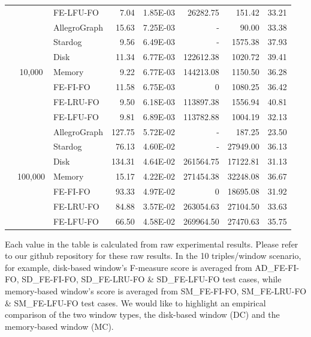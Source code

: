 \begin{table}[!htbp]
{\begin{tabular}{|c||c|l|r|r|r|r|r|}
&& FE-LFU-FO & 7.04 & 1.85E-03 & 26282.75 & 151.42 & 33.21 \\ \cline{2-8} 
& \multirow{7}{*}{10,000} &AllegroGraph& 15.63 & 7.25E-03 & - & 90.00 & 33.38 \\
&&Stardog& 9.56 & 6.49E-03 & - & 1575.38 & 37.93 \\ \cline{3-8} 
&& Disk & 11.34 & 6.77E-03 & 122612.38 & 1020.72 & 39.41 \\
&& Memory & 9.22 & 6.77E-03 & 144213.08 & 1150.50 & 36.28 \\ \cline{3-8} 
&& FE-FI-FO & 11.58 & 6.75E-03 & 0 & 1080.25 & 36.42 \\
&& FE-LRU-FO & 9.50 & 6.18E-03 & 113897.38 & 1556.94 & 40.81 \\
&& FE-LFU-FO & 9.81 & 6.89E-03 & 113782.88 & 1004.19 & 32.13 \\ \hhline{|=#=|=|=|=|=|=|=|}
\multirow{7}{*}{Large} & \multirow{7}{*}{100,000} &AllegroGraph& 127.75 & 5.72E-02 & - & 187.25 & 23.50 \\
&&Stardog& 76.13 & 4.60E-02 & - & 27949.00 & 36.13 \\ \cline{3-8} 
&& Disk & 134.31 & 4.64E-02 & 261564.75 & 17122.81 & 31.13 \\
&& Memory & 15.17 & 4.22E-02 & 271454.38 & 32248.08 & 36.67 \\ \cline{3-8} 
&& FE-FI-FO & 93.33 & 4.97E-02 & 0 & 18695.08 & 31.92 \\
&& FE-LRU-FO & 84.88 & 3.57E-02 & 263054.63 & 27104.50 & 33.63 \\
&& FE-LFU-FO & 66.50 & 4.58E-02 & 269964.50 & 27470.63 & 35.75 \\ \hline
\end{tabular}
}
\end{table}
Each value in the table is calculated from raw experimental results.
Please refer to our github repository for these raw results. 
In the 10 triples/window scenario, for example, 
disk-based window's F-measure score is averaged from AD\_FE-FI-FO, SD\_FE-FI-FO, SD\_FE-LRU-FO \& SD\_FE-LFU-FO test cases, 
while memory-based window's score is averaged from SM\_FE-FI-FO, SM\_FE-LRU-FO \& SM\_FE-LFU-FO test cases.
We would like to highlight an empirical comparison of the two window types, the disk-based window (DC) and the memory-based window (MC).

